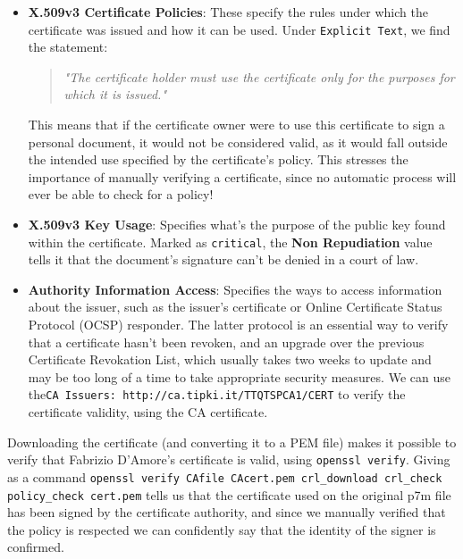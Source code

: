 \documentclass{article}
\begin{document}
\begin{itemize}
    \item \textbf{X.509v3 Certificate Policies}: These specify the rules under which the certificate was issued and how it can be used. Under \texttt{Explicit Text}, we find the statement:
    \begin{quote} \textit{"The certificate holder must use the certificate only for the purposes for which it is issued."} \end{quote} This means that if the certificate owner were to use this certificate to sign a personal document, it would not be considered valid, as it would fall outside the intended use specified by the certificate's policy.
    This stresses the importance of manually verifying a certificate, since no automatic process will ever be able to check for a policy!
    \item \textbf{X.509v3 Key Usage}: Specifies what's the purpose of the public key found within the certificate. Marked as \texttt{critical}, the \textbf{Non Repudiation} value tells it that the document's signature can't be denied in a court of law.
    \item \textbf{Authority Information Access}: Specifies the ways to access information about the issuer, such as the issuer’s certificate or Online Certificate Status Protocol (OCSP) responder. The latter protocol is an essential way to verify that a certificate hasn't been revoken, and an upgrade over the previous Certificate Revokation List, which usually takes two weeks to update and may be too long of a time to take appropriate security measures. We can use the\texttt{CA Issuers: http://ca.tipki.it/TTQTSPCA1/CERT} to verify the certificate validity, using the CA certificate.
\end{itemize}
 Downloading the certificate (and converting it to a PEM file) makes it possible to verify that Fabrizio D'Amore's certificate is valid, using \texttt{openssl verify}.
 Giving as a command \texttt{openssl verify \-CAfile CAcert.pem \-crl\_download \-crl\_check \-policy\_check cert.pem} tells us that the certificate used on the original p7m file has been signed by the certificate authority, and since we manually verified that the policy is respected we can confidently say that the identity of the signer is confirmed.
\end{document}
